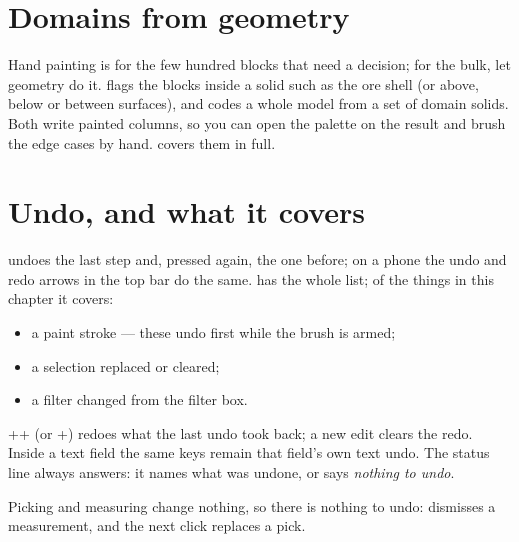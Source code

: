 \section{Domains from geometry}\label{sec:picking-geometry}
Hand painting is for the few hundred blocks that need a decision; for the bulk, let geometry do it.  flags the blocks inside a solid such as the ore shell (or above, below or between surfaces), and  codes a whole model from a set of domain solids. Both write painted columns, so you can open the palette on the result and brush the edge cases by hand.  covers them in full.

\section{Undo, and what it covers}\label{sec:picking-undo}
 undoes the last step and, pressed again, the one before; on a phone the undo and redo arrows in the top bar do the same.  has the whole list; of the things in this chapter it covers:

\begin{itemize}
\item a paint stroke — these undo first while the brush is armed;
\item a selection replaced or cleared;
\item a filter changed from the filter box.
\end{itemize}

++ (or +) redoes what the last undo took back; a new edit clears the redo. Inside a text field the same keys remain that field's own text undo. The status line always answers: it names what was undone, or says \emph{nothing to undo}.

Picking and measuring change nothing, so there is nothing to undo:  dismisses a measurement, and the next click replaces a pick.
